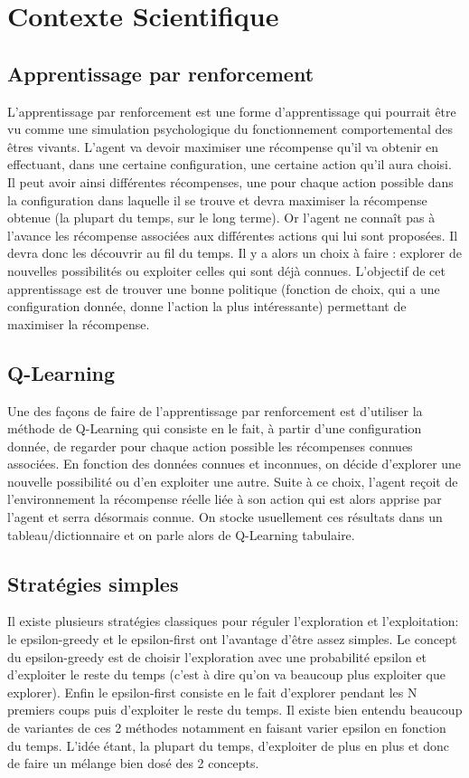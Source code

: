 \documentclass[10pt]{article}
\begin{document}
\section{Contexte Scientifique}
\subsection{Apprentissage par renforcement}
L'apprentissage par renforcement est une forme d'apprentissage qui pourrait être vu comme une simulation psychologique du fonctionnement comportemental des êtres vivants. L'agent va devoir maximiser une récompense qu'il va obtenir en effectuant, dans une certaine configuration, une certaine action qu'il aura choisi. Il peut avoir ainsi différentes récompenses, une pour chaque action possible dans la configuration dans laquelle il se trouve et devra maximiser la récompense obtenue (la plupart du temps, sur le long terme). Or l'agent ne connaît pas à l'avance les récompense associées aux différentes actions qui lui sont proposées. Il devra donc les découvrir au fil du temps. Il y a alors un choix à faire : explorer de nouvelles possibilités ou exploiter celles qui sont déjà connues. L'objectif de cet apprentissage est de trouver une bonne politique (fonction de choix, qui a une configuration donnée, donne l'action la plus intéressante) permettant de maximiser la récompense.
\subsection{Q-Learning}
Une des façons de faire de l'apprentissage par renforcement est d'utiliser la méthode de Q-Learning qui consiste en le fait, à partir d'une configuration donnée, de regarder pour chaque action possible les récompenses connues associées. En fonction des données connues et inconnues, on décide d'explorer une nouvelle possibilité ou d'en exploiter une autre. Suite à ce choix, l'agent reçoit de l'environnement la récompense réelle liée à son action qui est alors apprise par l'agent et serra désormais connue. On stocke usuellement ces résultats dans un tableau/dictionnaire et on parle alors de Q-Learning tabulaire.
\subsection{Stratégies simples}
Il existe plusieurs stratégies classiques pour réguler l'exploration et l'exploitation: le epsilon-greedy et le epsilon-first ont l'avantage d'être assez simples. Le concept du epsilon-greedy est de choisir l'exploration avec une probabilité epsilon et d'exploiter le reste du temps (c'est à dire qu'on va beaucoup plus exploiter que explorer). Enfin le epsilon-first consiste en le fait d'explorer pendant les N premiers coups puis d'exploiter le reste du temps. Il existe bien entendu beaucoup de variantes de ces 2 méthodes notamment en faisant varier epsilon en fonction du temps. L'idée étant, la plupart du temps, d'exploiter de plus en plus et donc de faire un mélange bien dosé des 2 concepts.
\end{document}
